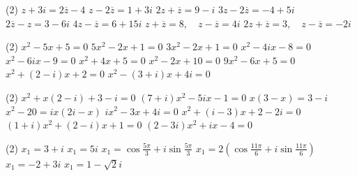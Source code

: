 \documentclass[12pt,a4paper]{article}
\begin{document}
\begin{exercise}
    \begin{tasks}(2)
        \task $z+3i=2\overline{z}-4$
        \task $z-2\overline{z}=1+3i$
        \task $2z+\overline{z}=9-i$
        \task $3z-2\overline{z}=-4+5i$
        \task $2\overline{z}-z=3-6i$
        \task $4z-\overline{z}=6+15i$
        \task $z+\overline{z}=8,\quad z-\overline{z}=4i$
        \task $2z+\overline{z}=3,\quad z-\overline{z}=-2i$
    \end{tasks}
\end{exercise}


\begin{exercise}
    \begin{tasks}(2)
        \task $x^2-5x+5=0$
        \task $5x^2-2x+1=0$
        \task $3x^2-2x+1=0$
        \task $x^2-4ix-8=0$
        \task $x^2-6ix-9=0$
        \task $x^2+4x+5=0$
        \task $x^2-2x+10=0$
        \task $9x^2-6x+5=0$
        \task $x^2+(2-i)x+2=0$
        \task $x^2-(3+i)x+4i=0$
    \end{tasks}
\end{exercise}


\begin{exercise}
    \begin{tasks}(2)
        \task $x^2+x(2-i)+3-i=0$
        \task $(7+i)x^2-5ix-1=0$
        \task $x(3-x)=3-i$
        \task $x^2-20=ix(2i-x)$
        \task $ix^2-3x+4i=0$
        \task $x^2+(i-3)x+2-2i=0$
        \task $(1+i)x^2+(2-i)x+1=0$
        \task $(2-3i)x^2+ix-4=0$
    \end{tasks}
\end{exercise}


\begin{exercise}
        \begin{tasks}(2)
            \task $x_1=3+i$
            \task $x_1=5i$
            \task $\displaystyle x_1=\cos\frac{5\pi}{3}+i\sin\frac{5\pi}{3}$
            \task $\displaystyle x_1=2\left(\cos\frac{11\pi}{6}+i\sin\frac{11\pi}{6}\right)$
            \task $x_1=-2+3i$
            \task $x_1=1-\sqrt2 i$
        \end{tasks}
\end{exercise}
\end{document}
